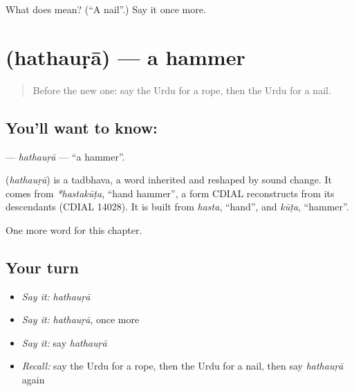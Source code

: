 \begin{tcolorbox}[breakable,colback=teal!4,colframe=teal!35!black,title={Before you move on}]
What does  mean? (\textquotedblleft{}A nail\textquotedblright{}.) Say it once more.
\end{tcolorbox}
\section[\texorpdfstring{\ur{ہتھوڑا} (hathauṛā)}{ہتھوڑا (hathauṛā)}]{ (hathauṛā) — a hammer}

\label{lesson:UR-C108-hathaura}



\begin{quote}
Before the new one: say the Urdu for a rope, then the Urdu for a nail.
\end{quote}

\subsection*{You'll want to know: }
\textbf{} — \emph{hathauṛā} — \textquotedblleft{}a hammer\textquotedblright{}.

\begin{cousinweb}
\textbf{} (\emph{hathauṛā}) is a tadbhava, a word inherited and reshaped by sound change. It comes from \emph{*hastakūṭa}, \textquotedblleft{}hand hammer\textquotedblright{}, a form CDIAL reconstructs from its descendants (CDIAL 14028). It is built from \emph{hasta}, \textquotedblleft{}hand\textquotedblright{}, and \emph{kūṭa}, \textquotedblleft{}hammer\textquotedblright{}.
\end{cousinweb}

\begin{grammarlens}[title={What you've built}]
One more word for this chapter.
\end{grammarlens}

\subsection*{Your turn}
\begin{itemize}
\raggedright
  \item \emph{Say it:} \emph{hathauṛā}
  \item \emph{Say it:} \emph{hathauṛā}, once more
  \item \emph{Say it:} say \emph{hathauṛā}
  \item \emph{Recall:} say the Urdu for a rope, then the Urdu for a nail, then say \emph{hathauṛā} again
\end{itemize}

